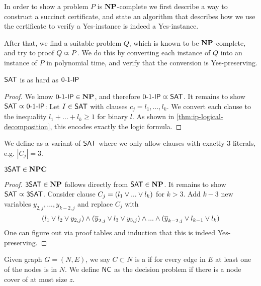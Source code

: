 \begin{strategy}
    In order to show a problem $P$ is $\mathbf{NP}$-complete we first describe a way to construct a succinct certificate,
    and state an algorithm that describes how we use the certificate to verify a Yes-instance is indeed a Yes-instance.

    After that, we find a suitable problem $Q$, which is known to be $\mathbf{NP}$-complete, and try to proof $Q \varpropto P$.
    We do this by converting each instance of $Q$ into an instance of $P$ in polynomial time, and verify that the conversion is Yes-preserving.
\end{strategy}

\begin{theorem}
    $\mathsf{SAT}$ is as hard as $\text{0-1-}\mathsf{IP}$
\end{theorem}
\begin{proof}
    We know $\text{0-1-}\mathsf{IP} \in \mathbf{NP}$, and therefore $\text{0-1-}\mathsf{IP} \varpropto \mathsf{SAT}$.
    It remains to show $\mathsf{SAT} \varpropto \text{0-1-}\mathsf{IP}$:
    Let $I \in \mathsf{SAT}$ with clauses $c_j={l_1,...,l_k}$. We convert each clause
    to the inequality $l_1+...+l_k\geq 1$ for binary $l$. As shown in \autoref{thm:ip-logical-decomposition}, this encodes exactly the
    logic formula.
\end{proof}
\begin{definition}[$\TSAT$]
    We define  as a variant of $\mathsf{SAT}$ where we only allow clauses with exactly 3 literals, e.g. $|C_j|=3$.

\end{definition}
\begin{theorem}
    $\mathsf{3SAT} \in \mathbf{NPC}$
\end{theorem}
\begin{proof}
    $\mathsf{3SAT} \in \mathbf{NP}$ follows directly from $\mathsf{SAT} \in \mathbf{NP}$. It remains to show $\mathsf{SAT} \varpropto \mathsf{3SAT}$.
    Consider clause $C_j = (l_1 \vee ... \vee l_k)$ for $k > 3$. Add $k-3$ new variables
    $y_{2,j},...,y_{k-2,j}$ and replace $C_j$ with
    \begin{align*}
        (l_1 \vee l_2 \vee y_{2,j}) \wedge (\overline{y}_{2,j} \vee l_3 \vee y_{3,j}) \wedge ... \wedge (\overline{y}_{k-2,j} \vee l_{k-1} \vee l_k)
    \end{align*}
    One can figure out via proof tables and induction that this is indeed Yes-preserving.
\end{proof}
\begin{definition}
    Given graph $G = (N,E)$, we say $C \subset N$ is a 
    if for every edge in $E$ at least one of the nodes is in $N$.
    We define $\mathsf{NC}$ as the decision problem if there is a node cover of at most size $z$.
\end{definition}
